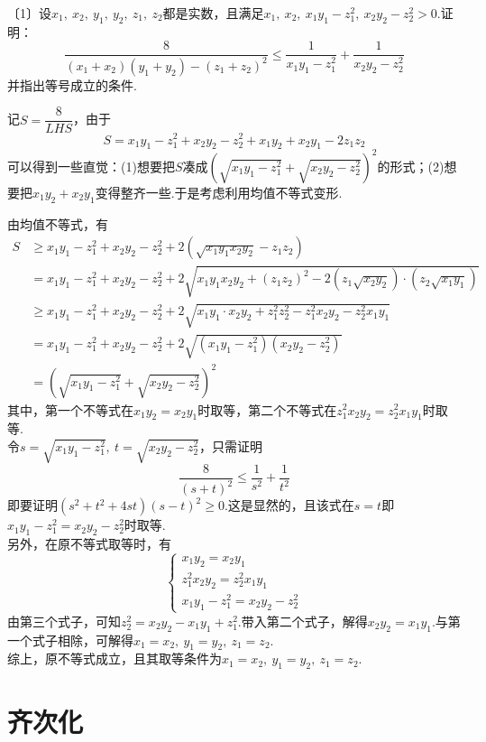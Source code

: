 \documentclass[lang=cn, zihao=4.5]{elegantbook}
\newcommand{\nd}[1]{〔#1〕}
\begin{document}
\begin{example} %
	\nd{1}设$x_1,~x_2,~y_1,~y_2,~z_1,~z_2$都是实数，且满足$x_1,~x_2,~x_1y_1-z_1^2,~x_2y_2-z_2^2 > 0$.证明：$$\frac{8}{(x_1+x_2)(y_1+y_2)-(z_1+z_2)^2} \leq \frac{1}{x_1y_1-z_1^2} + \frac{1}{x_2y_2-z_2^2} $$
	并指出等号成立的条件.
\end{example}
\begin{solution}
	\begin{guess}
		记$S=\dfrac{8}{LHS}$，由于$$S = x_1y_1-z_1^2+x_2y_2-z_2^2+x_1y_2+x_2y_1-2z_1z_2$$
		可以得到一些直觉：(1)想要把$S$凑成$(\sqrt{x_1y_1-z_1^2} + \sqrt{x_2y_2-z_2^2})^2$的形式；(2)想要把$x_1y_2+x_2y_1$变得整齐一些.于是考虑利用均值不等式变形.
	\end{guess}
	由均值不等式，有
	\begin{align*}
		S &\geq x_1y_1-z_1^2+x_2y_2-z_2^2+2(\sqrt{x_1y_1x_2y_2}-z_1z_2) \\
		&= x_1y_1-z_1^2+x_2y_2-z_2^2+2\sqrt{x_1y_1x_2y_2 + (z_1z_2)^2 - 2(z_1\sqrt{x_2y_2}) \cdot (z_2 \sqrt{x_1y_1})} \\
		&\geq x_1y_1-z_1^2+x_2y_2-z_2^2+2\sqrt{x_1y_1 \cdot x_2y_2 + z_1^2z_2^2 - z_1^2x_2y_2 - z_2^2x_1y_1} \\
		&= x_1y_1-z_1^2+x_2y_2-z_2^2+2\sqrt{(x_1y_1-z_1^2)(x_2y_2-z_2^2)} \\
		&= (\sqrt{x_1y_1-z_1^2} + \sqrt{x_2y_2-z_2^2})^2
	\end{align*}
	其中，第一个不等式在$x_1y_2=x_2y_1$时取等，第二个不等式在$z_1^2x_2y_2=z_2^2x_1y_1$时取等. \\
	令$s=\sqrt{x_1y_1-z_1^2},~t=\sqrt{x_2y_2-z_2^2}$，只需证明$$\frac{8}{(s+t)^2} \leq \frac{1}{s^2} + \frac{1}{t^2}$$
	即要证明$(s^2+t^2+4st)(s-t)^2 \geq 0$.这是显然的，且该式在$s=t$即$x_1y_1-z_1^2=x_2y_2-z_2^2$时取等. \\
	另外，在原不等式取等时，有$$
	\begin{cases}
		x_1y_2=x_2y_1 \\
		z_1^2x_2y_2=z_2^2x_1y_1 \\
		x_1y_1-z_1^2=x_2y_2-z_2^2
	\end{cases}$$
	由第三个式子，可知$z_2^2=x_2y_2-x_1y_1+z_1^2$.带入第二个式子，解得$x_2y_2=x_1y_1$.与第一个式子相除，可解得$x_1=x_2,~y_1=y_2,~z_1=z_2$. \\
	综上，原不等式成立，且其取等条件为$x_1=x_2,~y_1=y_2,~z_1=z_2$.
\end{solution}

\section{齐次化}
\end{document}
